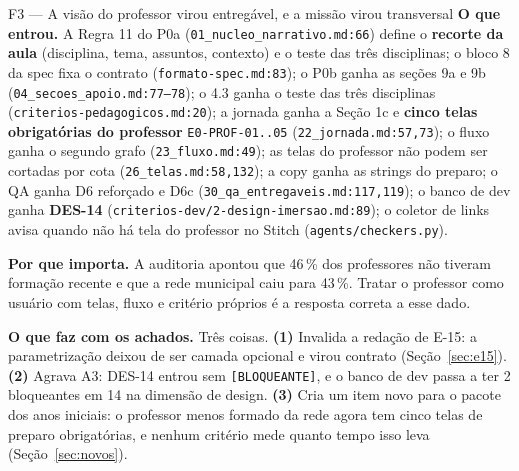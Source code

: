 \documentclass[11pt,a4paper]{article}
\begin{document}
\begin{creditobox}{F3 --- A visão do professor virou entregável, e a missão virou transversal}
\textbf{O que entrou.} A Regra 11 do P0a (\texttt{01\_nucleo\_narrativo.md:66}) define o
\textbf{recorte da aula} (disciplina, tema, assuntos, contexto) e o teste das três disciplinas; o
bloco 8 da spec fixa o contrato (\texttt{formato-spec.md:83}); o P0b ganha as seções 9a e 9b
(\texttt{04\_secoes\_apoio.md:77--78}); o 4.3 ganha o teste das três disciplinas
(\texttt{criterios-pedagogicos.md:20}); a jornada ganha a Seção 1c e \textbf{cinco telas obrigatórias
do professor} \texttt{E0-PROF-01..05} (\texttt{22\_jornada.md:57,73}); o fluxo ganha o segundo grafo
(\texttt{23\_fluxo.md:49}); as telas do professor não podem ser cortadas por cota
(\texttt{26\_telas.md:58,132}); a copy ganha as strings do preparo; o QA ganha D6 reforçado e D6c
(\texttt{30\_qa\_entregaveis.md:117,119}); o banco de dev ganha \textbf{DES-14}
(\texttt{criterios-dev/2-design-imersao.md:89}); o coletor de links avisa quando não há tela do
professor no Stitch (\texttt{agents/checkers.py}).

\textbf{Por que importa.} A auditoria apontou que 46\,\% dos professores não tiveram formação recente
e que a rede municipal caiu para 43\,\%. Tratar o professor como usuário com telas, fluxo e critério
próprios é a resposta correta a esse dado.

\textbf{O que faz com os achados.} Três coisas. \textbf{(1)} Invalida a redação de E-15: a
parametrização deixou de ser camada opcional e virou contrato (Seção~\ref{sec:e15}).
\textbf{(2)} Agrava A3: DES-14 entrou sem \texttt{[BLOQUEANTE]}, e o banco de dev passa a ter 2
bloqueantes em 14 na dimensão de design. \textbf{(3)} Cria um item novo para o pacote dos anos
iniciais: o professor menos formado da rede agora tem cinco telas de preparo obrigatórias, e nenhum
critério mede quanto tempo isso leva (Seção~\ref{sec:novos}).
\end{creditobox}
\end{document}
